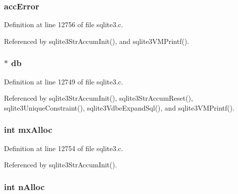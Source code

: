 \subsubsection[{acc\+Error}]{ acc\+Error}\label{struct_str_accum_a3e843437fedb66c308590239ede54574}


Definition at line 12756 of file sqlite3.\+c.



Referenced by sqlite3\+Str\+Accum\+Init(), and sqlite3\+V\+M\+Printf().

\hypertarget{struct_str_accum_ad6e663497d2c934364b3bcf07496b30b}{}
\subsubsection[{db}]{$\ast$ db}\label{struct_str_accum_ad6e663497d2c934364b3bcf07496b30b}


Definition at line 12749 of file sqlite3.\+c.



Referenced by sqlite3\+Str\+Accum\+Init(), sqlite3\+Str\+Accum\+Reset(), sqlite3\+Unique\+Constraint(), sqlite3\+Vdbe\+Expand\+Sql(), and sqlite3\+V\+M\+Printf().

\hypertarget{struct_str_accum_a130d420f3104ea9587bd93b449573886}{}
\subsubsection[{mx\+Alloc}]{\setlength{\rightskip}{0pt plus 5cm}int mx\+Alloc}\label{struct_str_accum_a130d420f3104ea9587bd93b449573886}


Definition at line 12754 of file sqlite3.\+c.



Referenced by sqlite3\+Str\+Accum\+Init().

\hypertarget{struct_str_accum_aec887fbb53f08664685baf4fb69ba5f5}{}
\subsubsection[{n\+Alloc}]{\setlength{\rightskip}{0pt plus 5cm}int n\+Alloc}\label{struct_str_accum_aec887fbb53f08664685baf4fb69ba5f5}


